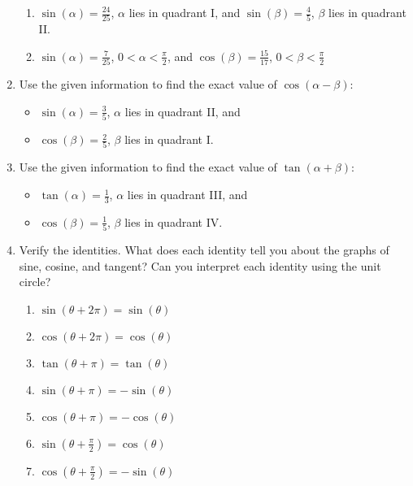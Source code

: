 \begin{enumerate}
\begin{enumerate}
\item $\sin(\alpha)=\frac{24}{25}$, $\alpha$ lies in quadrant I, and $\sin(\beta)=\frac{4}{5}$, $\beta$ lies in quadrant II.
\vfill


\item $\sin(\alpha)=\frac{7}{25}$, $0<\alpha<\frac{\pi}{2}$, and $\cos(\beta)=\frac{15}{17}$, $0<\beta<\frac{\pi}{2}$
\vfill
\end{enumerate}

\newpage

\item Use the given information to find the exact value of $\cos(\alpha-\beta)$:
\begin{itemize}
	\item $\sin(\alpha)=\frac{3}{5}$, $\alpha$ lies in quadrant II, and
	\item  $\cos(\beta)=\frac{2}{5}$, $\beta$ lies in quadrant I.
\end{itemize}
\vfill

\item Use the given information to find the exact value of $\tan(\alpha+\beta)$:
\begin{itemize}
	\item $\tan(\alpha)=\frac{1}{3}$, $\alpha$ lies in quadrant III, and
	\item $\cos(\beta)=\frac{1}{5}$, $\beta$ lies in quadrant IV.

\end{itemize}

\vfill
\newpage

\item Verify the identities.  What does each identity tell you about the graphs of sine, cosine, and tangent?  Can you interpret each identity using the unit circle?

\begin{enumerate}
\item $\displaystyle\sin\left(\theta+2\pi\right)=\sin(\theta)$
\vfill
\item $\displaystyle\cos\left(\theta+2\pi\right)=\cos(\theta)$
\vfill
\item $\displaystyle\tan\left(\theta+\pi\right)=\tan(\theta)$
\vfill
\item $\displaystyle\sin\left(\theta+\pi\right)=-\sin(\theta)$
\vfill
\item $\displaystyle\cos\left(\theta+\pi\right)=-\cos(\theta)$
\vfill
\item $\displaystyle\sin\left(\theta+\frac{\pi}{2}\right)=\cos(\theta)$
\vfill
\item $\displaystyle\cos\left(\theta+\frac{\pi}{2}\right)=-\sin(\theta)$
\vfill

\end{enumerate}






\end{enumerate}

